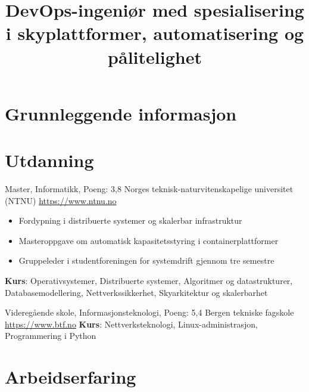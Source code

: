 \documentclass[a4paper, serif, 10pt]{moderncv}
\title{DevOps-ingeniør med spesialisering i skyplattformer, automatisering og pålitelighet}
\begin{document}
\maketitle

\section{Grunnleggende informasjon}

\section{Utdanning}

        {Master, Informatikk, Poeng: 3,8}
        {Norges teknisk-naturvitenskapelige universitet (NTNU)}
        {\url{https://www.ntnu.no}}
        {}
        {\begin{itemize}
\item Fordypning i distribuerte systemer og skalerbar infrastruktur
\item Masteroppgave om automatisk kapasitetsstyring i containerplattformer
\item Gruppeleder i studentforeningen for systemdrift gjennom tre semestre
\end{itemize}
\textbf{Kurs}: Operativsystemer, Distribuerte systemer, Algoritmer og datastrukturer, Databasemodellering, Nettverkssikkerhet, Skyarkitektur og skalerbarhet}

        {Videregående skole, Informasjonsteknologi, Poeng: 5,4}
        {Bergen tekniske fagskole}
        {\url{https://www.btf.no}}
        {}
        {\textbf{Kurs}: Nettverksteknologi, Linux-administrasjon, Programmering i Python}
\section{Arbeidserfaring}
\end{document}
